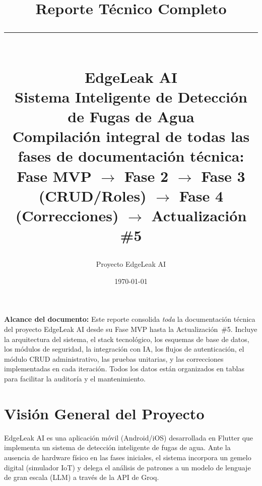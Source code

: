 \documentclass[12pt,a4paper]{article}
\title{
  \Huge\textbf{Reporte Técnico Completo}\\[0.5em]
  \textcolor{primaryblue}{\rule{\linewidth}{1.5pt}}\\[0.3em]
  \Large\textbf{EdgeLeak AI}\\[0.2em]
  \large Sistema Inteligente de Detección de Fugas de Agua\\[0.5em]
  \normalsize Compilación integral de todas las fases de documentación técnica:\\
  Fase MVP $\rightarrow$ Fase 2 $\rightarrow$ Fase 3 (CRUD/Roles) $\rightarrow$
  Fase 4 (Correcciones) $\rightarrow$ Actualización \#5
}
\author{Proyecto EdgeLeak AI}
\date{\today}
\begin{document}
\maketitle
\thispagestyle{fancy}

\begin{mdframed}[linecolor=primaryblue,linewidth=1.5pt,backgroundcolor=blue!3]
\textbf{Alcance del documento:} Este reporte consolida \emph{toda} la documentación técnica
del proyecto EdgeLeak AI desde su Fase MVP hasta la Actualización~\#5. Incluye la
arquitectura del sistema, el stack tecnológico, los esquemas de base de datos, los módulos
de seguridad, la integración con IA, los flujos de autenticación, el módulo CRUD
administrativo, las pruebas unitarias, y las correcciones implementadas en cada iteración.
Todos los datos están organizados en tablas para facilitar la auditoría y el mantenimiento.
\end{mdframed}

\vspace{1em}
\tableofcontents
\newpage

\section{Visión General del Proyecto}

EdgeLeak AI es una aplicación móvil (Android/iOS) desarrollada en Flutter que implementa
un sistema de detección inteligente de fugas de agua. Ante la ausencia de hardware físico
en las fases iniciales, el sistema incorpora un gemelo digital (simulador IoT) y delega
el análisis de patrones a un modelo de lenguaje de gran escala (LLM) a través de la API
de Groq.
\end{document}
